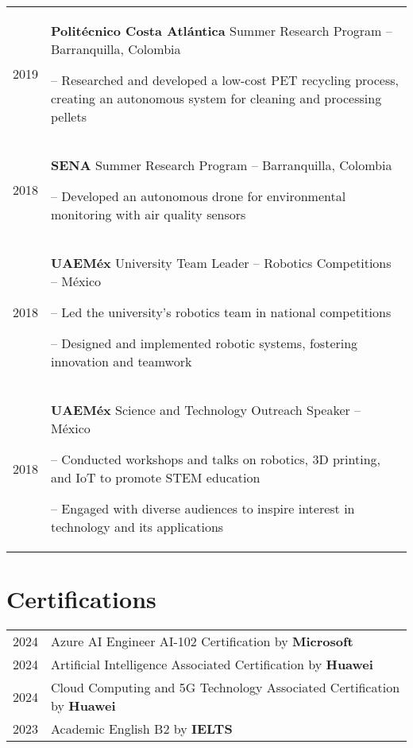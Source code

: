 \documentclass[a4paper,12pt]{article}
\begin{document}
\begin{tabularx}{\linewidth}{@{}l X@{}}
2019 & \textbf{Politécnico Costa Atlántica} Summer Research Program – Barranquilla, Colombia 
\item[--] Researched and developed a low-cost PET recycling process, creating an autonomous system for cleaning and processing pellets\hfill \\

2018 & \textbf{SENA} Summer Research Program – Barranquilla, Colombia
\item[--] Developed an autonomous drone for environmental monitoring with air quality sensors\hfill \\

2018 & \textbf{UAEMéx} University Team Leader – Robotics Competitions – México  
\item[--] Led the university’s robotics team in national competitions
\item[--] Designed and implemented robotic systems, fostering innovation and teamwork\hfill \\

2018 & \textbf{UAEMéx} Science and Technology Outreach Speaker – México 
\item[--] Conducted workshops and talks on robotics, 3D printing, and IoT to promote STEM education
\item[--] Engaged with diverse audiences to inspire interest in technology and its applications\hfill \\

\end{tabularx}

\section{Certifications}
\begin{tabularx}{\linewidth}{@{}l X@{}}	
2024 & Azure AI Engineer AI-102 Certification by \textbf{Microsoft} \hfill  \\

2024 & Artificial Intelligence Associated Certification by \textbf{Huawei} \hfill \\ 

2024 & Cloud Computing and 5G Technology Associated Certification by \textbf{Huawei} \hfill \\

2023 & Academic English B2 by \textbf{IELTS} \hfill \\
\end{tabularx}
\end{document}
